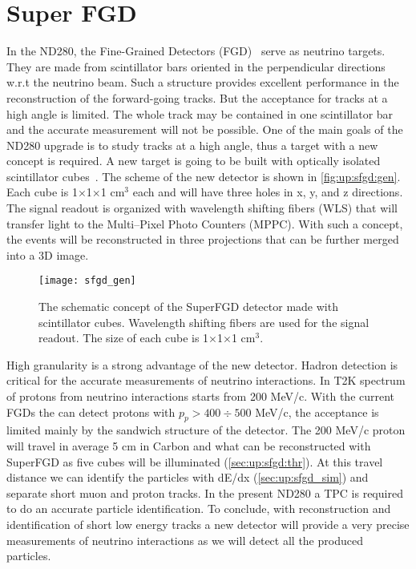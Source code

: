 \documentclass[main.tex]{subfiles}
\begin{document}
\renewcommand{\labelitemi}{\ding{226}}
\renewcommand{\labelitemii}{\ding{227}}

\newcommand{\sfgdx}{192}
\newcommand{\sfgdz}{184}
\newcommand{\sfgdy}{56}

\chapter{Super FGD}
\label{ch:up:sfgd}
In the ND280, the Fine-Grained Detectors (FGD)~\cite{Amaudruz2012} serve as neutrino targets. They are made from scintillator bars oriented in the perpendicular directions w.r.t the neutrino beam. Such a structure provides excellent performance in the reconstruction of the forward-going tracks. But the acceptance for tracks at a high angle is limited. The whole track may be contained in one scintillator bar and the accurate measurement will not be possible. One of the main goals of the ND280 upgrade is to study tracks at a high angle, thus a target with a new concept is required. A new target is going to be built with optically isolated scintillator cubes~\cite{Blondel2018}. The scheme of the new detector is shown in \autoref{fig:up:sfgd:gen}. Each cube is 1$\times$1$\times$1 $\text{cm}^3$ each and will have three holes in x, y, and z directions. The signal readout is organized with wavelength shifting fibers (WLS) that will transfer light to the Multi--Pixel Photo Counters (MPPC). With such a concept, the events will be reconstructed in three projections that can be further merged into a 3D image.

\begin{figure}[!ht]
	\centering
	\texttt{[image: sfgd\_gen]}
	\caption{The schematic concept of the SuperFGD detector made with scintillator cubes. Wavelength shifting fibers are used for the signal readout. The size of each cube is 1$\times$1$\times$1 $\text{cm}^3$.}
	\label{fig:up:sfgd:gen}
\end{figure}
High granularity is a strong advantage of the new detector. Hadron detection is critical for the accurate measurements of neutrino interactions. In T2K spectrum of protons from neutrino interactions starts from 200 MeV/c. With the current FGDs the can detect protons with $p_p > 400 \div 500 $ MeV/c, the acceptance is limited mainly by the sandwich structure of the detector. The 200 MeV/c proton will travel in average 5 cm in Carbon and what can be reconstructed with SuperFGD as five cubes will be illuminated (\autoref{sec:up:sfgd:thr}). At this travel distance we can identify the particles with dE/dx (\autoref{sec:up:sfgd_sim}) and separate short muon and proton tracks. In the present ND280 a TPC is required to do an accurate particle identification. To conclude, with reconstruction and identification of short low energy tracks a new detector will provide a very precise measurements of neutrino interactions as we will detect all the produced particles.
\end{document}
